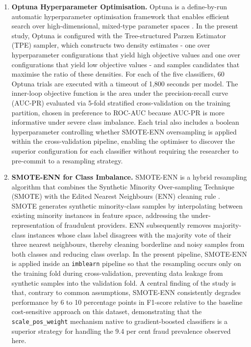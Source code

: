 \begin{enumerate}[label=\roman*.]

\item \textbf{Optuna Hyperparameter Optimisation.}
Optuna is a define-by-run automatic hyperparameter optimisation framework that
enables efficient search over high-dimensional, mixed-type parameter spaces
\cite{akiba2019}. In the present study, Optuna is configured with the
Tree-structured Parzen Estimator (TPE) sampler, which constructs two density
estimates - one over hyperparameter configurations that yield high objective
values and one over configurations that yield low objective values - and samples
candidates that maximise the ratio of these densities. For each of the five
classifiers, 60 Optuna trials are executed with a timeout of 1{,}800 seconds per
model. The inner-loop objective function is the area under the precision-recall
curve (AUC-PR) evaluated via 5-fold stratified cross-validation on the training
partition, chosen in preference to ROC-AUC because AUC-PR is more informative
under severe class imbalance. Each trial also includes a boolean hyperparameter
controlling whether SMOTE-ENN oversampling is applied within the cross-validation
pipeline, enabling the optimiser to discover the superior configuration for each
classifier without requiring the researcher to pre-commit to a resampling
strategy.

\item \textbf{SMOTE-ENN for Class Imbalance.}
SMOTE-ENN is a hybrid resampling algorithm that combines the Synthetic Minority
Over-sampling Technique (SMOTE) with the Edited Nearest Neighbours (ENN) cleaning
rule \cite{batista2004}. SMOTE generates synthetic minority-class samples by
interpolating between existing minority instances in feature space, addressing
the under-representation of fraudulent providers. ENN subsequently removes
majority-class instances whose class label disagrees with the majority vote of
their three nearest neighbours, thereby cleaning borderline and noisy samples
from both classes and reducing class overlap. In the present pipeline,
SMOTE-ENN is applied inside an \texttt{imblearn} pipeline so that the resampling
occurs only on the training fold during cross-validation, preventing data leakage
from synthetic samples into the validation fold. A central finding of the study
is that, contrary to common assumptions, SMOTE-ENN consistently degrades
performance by 6 to 10 percentage points in F1-score relative to the baseline
cost-sensitive approach on this dataset, demonstrating that the
\texttt{scale\_pos\_weight} mechanism native to gradient-boosted classifiers is
a superior strategy for handling the 9.4 per cent fraud prevalence observed here.


\end{enumerate}
